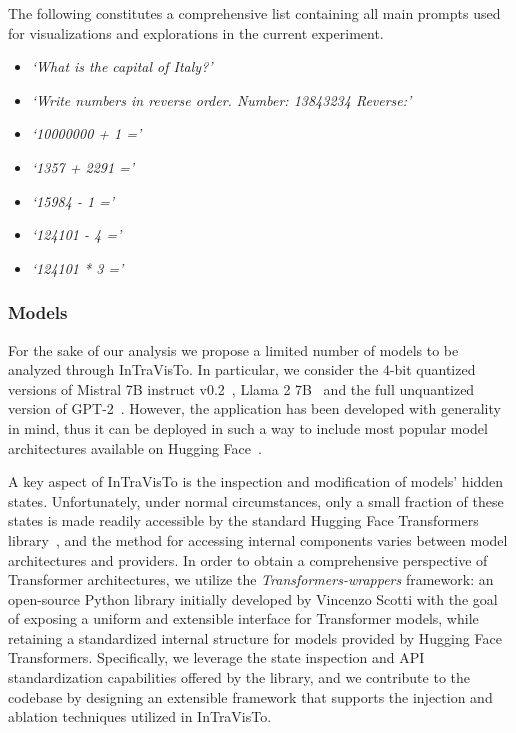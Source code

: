 The following constitutes a comprehensive list containing all main prompts used for visualizations and explorations in the current experiment.

\begin{multicols}{2}
    \begin{itemize}
        \item \emph{`What is the capital of Italy?'}
        \item \emph{`Write numbers in reverse order. Number: 13843234 Reverse:'}
        \item \emph{`10000000 + 1 ='}
        \item \emph{`1357 + 2291 ='}
        \item \emph{`15984 - 1 ='}
        \item \emph{`124101 - 4 ='}
        \item \emph{`124101 * 3 ='}
    \end{itemize}
\end{multicols}

\subsubsection{Models}

For the sake of our analysis we propose a limited number of models to be analyzed through InTraVisTo.
In particular, we consider the $4$-bit quantized versions of Mistral 7B instruct v0.2~\cite{jiang2023}, Llama 2 7B~\cite{touvron2023} and the full unquantized version of GPT-2~\cite{radford2019}.
However, the application has been developed with generality in mind, thus it can be deployed in such a way to include most popular model architectures available on Hugging Face~\cite{wolf2020}.

A key aspect of InTraVisTo is the inspection and modification of models' hidden states.
Unfortunately, under normal circumstances, only a small fraction of these states is made readily accessible by the standard Hugging Face Transformers library~\cite{wolf2020}, and the method for accessing internal components varies between model architectures and providers.
In order to obtain a comprehensive perspective of Transformer architectures, we utilize the \emph{Transformers-wrappers} framework\footnotemark: an open-source Python library initially developed by Vincenzo Scotti with the goal of exposing a uniform and extensible interface for Transformer models, while retaining a standardized internal structure for models provided by Hugging Face Transformers.
Specifically, we leverage the state inspection and API standardization capabilities offered by the library, and we contribute to the codebase by designing an extensible framework that supports the injection and ablation techniques utilized in InTraVisTo.

